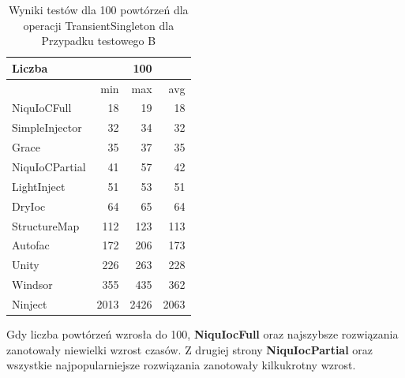\documentclass[12pt]{article}
\begin{document}
\begin{table}[H]
\captionsetup{belowskip=0pt,aboveskip=0pt}
\begin{center}
\begin{small}
	\begin{tabular}{ | l | r r r | }
    		\hline
Liczba & & 100 & \\ \hline
 & min & max & avg \\ \hline
NiquIoCFull & 18 & 19 & 18 \\ \hline
SimpleInjector & 32 & 34 & 32 \\ \hline
Grace & 35 & 37 & 35 \\ \hline
NiquIoCPartial & 41 & 57 & 42 \\ \hline
LightInject & 51 & 53 & 51 \\ \hline
DryIoc & 64 & 65 & 64 \\ \hline
StructureMap & 112 & 123 & 113 \\ \hline
Autofac & 172 & 206 & 173 \\ \hline
Unity & 226 & 263 & 228 \\ \hline
Windsor & 355 & 435 & 362 \\ \hline
Ninject & 2013 & 2426 & 2063 \\ \hline
  	\end{tabular}
\end{small}
\end{center}
\caption{Wyniki testów dla 100 powtórzeń dla operacji TransientSingleton dla Przypadku testowego B}
\label{TestCaseB_TransientSingleton100}
\end{table}
Gdy liczba powtórzeń wzrosła do 100, \textbf{NiquIocFull} oraz najszybsze rozwiązania zanotowały niewielki wzrost czasów. Z drugiej strony \textbf{NiquIocPartial} oraz wszystkie najpopularniejsze rozwiązania zanotowały kilkukrotny wzrost.
\\ \\
\end{document}
